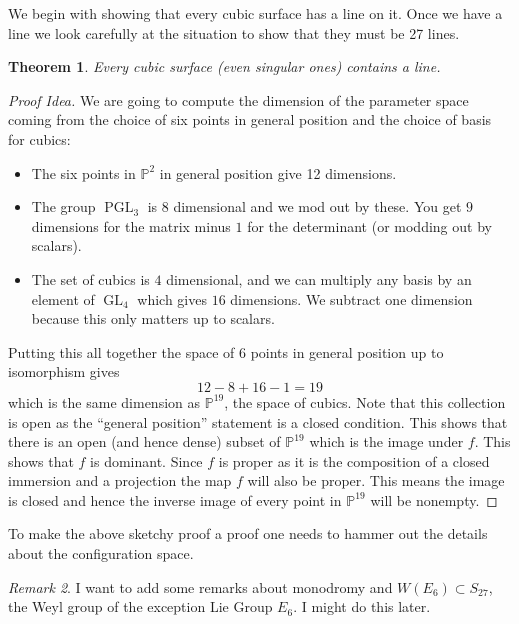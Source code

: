 \documentclass[12pt]{article}
\numberwithin{equation}{section}
\newtheorem{theorem}{Theorem}[subsection]
\theoremstyle{definition}
\theoremstyle{remark}
\newtheorem{remark}[theorem]{Remark}
\newcommand{\PP}{\mathbb{P}}
\newcommand{\GL}{\operatorname{GL}}
\newcommand{\PGL}{\operatorname{PGL}}
\begin{document}
We begin with showing that every cubic surface has a line on it. 
Once we have a line we look carefully at the situation to show that they must be 27 lines.
\begin{theorem}
	Every cubic surface (even singular ones) contains a line. 
\end{theorem}
\begin{proof}[Proof Idea]
We are going to compute the dimension of the parameter space coming from the choice of six points in general position and the choice of basis for cubics:
	\begin{itemize} 
		\item The six points in $\PP^2$ in general position give 12 dimensions. 
		\item The group $\PGL_3$ is 8 dimensional and we mod out by these. You get $9$ dimensions for the matrix minus $1$ for the determinant (or modding out by scalars). 
		\item The set of cubics is $4$ dimensional, and we can multiply any basis by an element of $\GL_4$ which gives $16$ dimensions. We subtract one dimension because this only matters up to scalars. 
	\end{itemize}
	Putting this all together the space of 6 points in general position up to isomorphism gives 
	$$ 12-8+16-1 = 19 $$
	which is the same dimension as $\PP^{19}$, the space of cubics. 
	Note that this collection is open as the ``general position'' statement is a closed condition.
	This shows that there is an open (and hence dense) subset of $\PP^{19}$ which is the image under $f$. 
	This shows that $f$ is dominant. 
	Since $f$ is proper as it is the composition of a closed immersion and a projection the map $f$ will also be proper. 
	This means the image is closed and hence the inverse image of every point in $\PP^{19}$ will be nonempty. 
\end{proof}
To make the above sketchy proof a proof one needs to hammer out the details about the configuration space. 
\begin{remark}
I want to add some remarks about monodromy and $W(E_6) \subset S_{27}$, the Weyl group of the exception Lie Group $E_6$. I might do this later. 
\end{remark}
\end{document}

